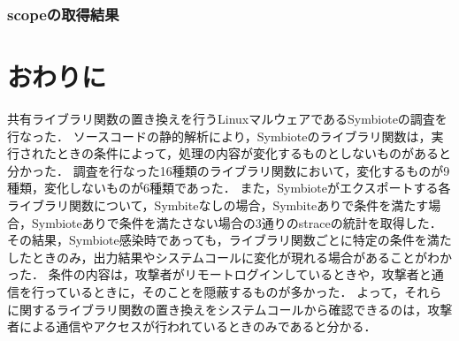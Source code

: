 \documentclass[submit,techreq,noauthor]{eco}	%
\begin{document}
\subsubsection{scopeの取得結果}



\section{おわりに}
共有ライブラリ関数の置き換えを行うLinuxマルウェアであるSymbioteの調査を行なった．
ソースコードの静的解析により，Symbioteのライブラリ関数は，実行されたときの条件によって，処理の内容が変化するものとしないものがあると分かった．
調査を行なった16種類のライブラリ関数において，変化するものが9種類，変化しないものが6種類であった．
また，Symbioteがエクスポートする各ライブラリ関数について，Symbiteなしの場合，Symbiteありで条件を満たす場合，Symbioteありで条件を満たさない場合の3通りのstraceの統計を取得した．
その結果，Symbiote感染時であっても，ライブラリ関数ごとに特定の条件を満たしたときのみ，出力結果やシステムコールに変化が現れる場合があることがわかった．
条件の内容は，攻撃者がリモートログインしているときや，攻撃者と通信を行っているときに，そのことを隠蔽するものが多かった．
よって，それらに関するライブラリ関数の置き換えをシステムコールから確認できるのは，攻撃者による通信やアクセスが行われているときのみであると分かる．

\setlength\baselineskip{12pt}
{\small
	
	
}
\end{document}
